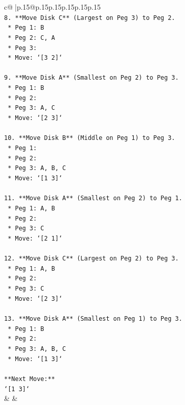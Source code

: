 \documentclass{article}
\begin{document}
{\begin{supertabular}{c@{$\;$}|p{.15\linewidth}@{}p{.15\linewidth}p{.15\linewidth}p{.15\linewidth}p{.15\linewidth}p{.15\linewidth}}
{{{\\ 
\texttt{8.  **Move Disk C** (Largest on Peg 3) to Peg 2.} \\
\texttt{    *   Peg 1: B} \\
\texttt{    *   Peg 2: C, A} \\
\texttt{    *   Peg 3:} \\
\texttt{    *   Move: `{[}3 2{]}`} \\
\\ 
\texttt{9.  **Move Disk A** (Smallest on Peg 2) to Peg 3.} \\
\texttt{    *   Peg 1: B} \\
\texttt{    *   Peg 2:} \\
\texttt{    *   Peg 3: A, C} \\
\texttt{    *   Move: `{[}2 3{]}`} \\
\\ 
\texttt{10. **Move Disk B** (Middle on Peg 1) to Peg 3.} \\
\texttt{    *   Peg 1:} \\
\texttt{    *   Peg 2:} \\
\texttt{    *   Peg 3: A, B, C} \\
\texttt{    *   Move: `{[}1 3{]}`} \\
\\ 
\texttt{11. **Move Disk A** (Smallest on Peg 2) to Peg 1.} \\
\texttt{    *   Peg 1: A, B} \\
\texttt{    *   Peg 2:} \\
\texttt{    *   Peg 3: C} \\
\texttt{    *   Move: `{[}2 1{]}`} \\
\\ 
\texttt{12. **Move Disk C** (Largest on Peg 2) to Peg 3.} \\
\texttt{    *   Peg 1: A, B} \\
\texttt{    *   Peg 2:} \\
\texttt{    *   Peg 3: C} \\
\texttt{    *   Move: `{[}2 3{]}`} \\
\\ 
\texttt{13. **Move Disk A** (Smallest on Peg 1) to Peg 3.} \\
\texttt{    *   Peg 1: B} \\
\texttt{    *   Peg 2:} \\
\texttt{    *   Peg 3: A, B, C} \\
\texttt{    *   Move: `{[}1 3{]}`} \\
\\ 
\texttt{**Next Move:**} \\
\texttt{`{[}1 3{]}`} \\
            }
        }
    }
    & & \\ \\


\end{supertabular}}
\end{document}
